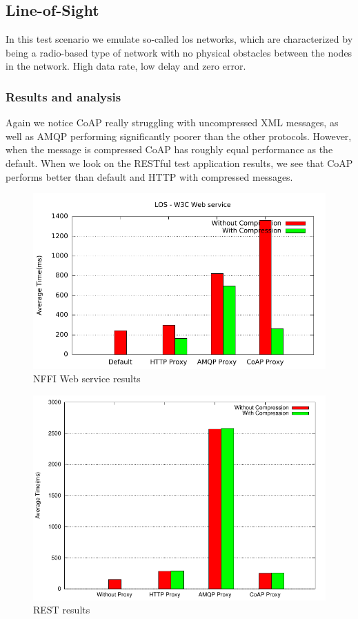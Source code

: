 \subsection{Line-of-Sight}

In this test scenario we emulate so-called \gls{los} networks, which are
characterized by being a radio-based type of network with no physical obstacles
between the nodes in the network. High data rate, low delay and zero error.

\subsubsection{Results and analysis}

Again we notice CoAP really struggling with uncompressed XML messages, as well
as AMQP performing significantly poorer than the other protocols. However,
when the message is compressed CoAP has roughly equal performance as the
default. When we look on the RESTful test application results, we see that
CoAP performs better than default and HTTP with compressed messages.

\begin{figure}[H]
\center
\includegraphics[scale=0.75]{../results/los/nffi/out.pdf}
\caption{NFFI Web service results}
\end{figure}

\begin{figure}[H]
\center
\includegraphics[scale=0.75]{../results/los/rest/result.pdf}
\caption{REST results}
\end{figure}



